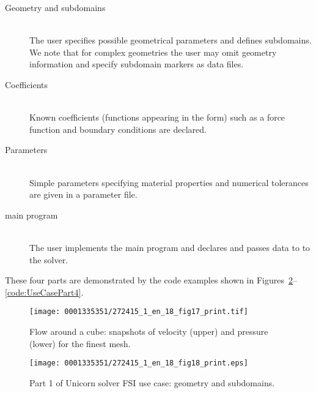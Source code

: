 \begin{description}
\item[Geometry and subdomains] \ \\ The user specifies possible
  geometrical parameters and defines subdomains. We note that for
  complex geometries the user may omit geometry information and
  specify subdomain markers as data files.
\item[Coefficients] \ \\ Known coefficients (functions appearing in the form)
  such as a force function and boundary conditions are declared.
\item[Parameters] \ \\ Simple parameters specifying material properties and numerical tolerances are given
in a parameter file.
\item[main program] \ \\ The user implements the main program and
  declares and passes data to to the solver.
\end{description}
These four parts are demonstrated by the code examples shown in
Figures~\ref{code:UseCasePart1}--\ref{code:UseCasePart4}.

\begin{figure}[!p]
\vspace*{-4pt}
\centering
\texttt{[image: 0001335351/272415\_1\_en\_18\_fig17\_print.tif]}
\caption{Flow around a cube: snapshots of velocity (upper) and pressure
(lower) for the finest mesh.}\label{fig:cube2}
\end{figure}


\begin{figure}[!p]
\bwfig
\texttt{[image: 0001335351/272415\_1\_en\_18\_fig18\_print.eps]}
\caption{Part 1 of Unicorn solver FSI use case: geometry and subdomains.}
\label{code:UseCasePart1}\vspace*{1.5pc}
\end{figure}


